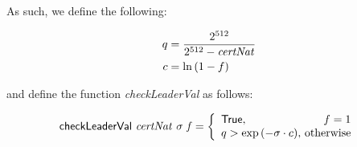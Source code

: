 As such, we define the following:

\begin{align*}
  q & = \frac{2^{512}}{2^{512} - \mathit{certNat}} \\
  c & = \ln{(1 - f)}
\end{align*}

and define the function \textit{checkLeaderVal} as follows:

\begin{equation*}
  \fun{checkLeaderVal}~\var{certNat}~\sigma~\var{f} =
    \left\{
      \begin{array}{l@{~}r}
        \mathsf{True}, & f = 1 \\
        q > \exp{(-\sigma \cdot c)}, & \text{otherwise}
      \end{array}
    \right.
\end{equation*}
